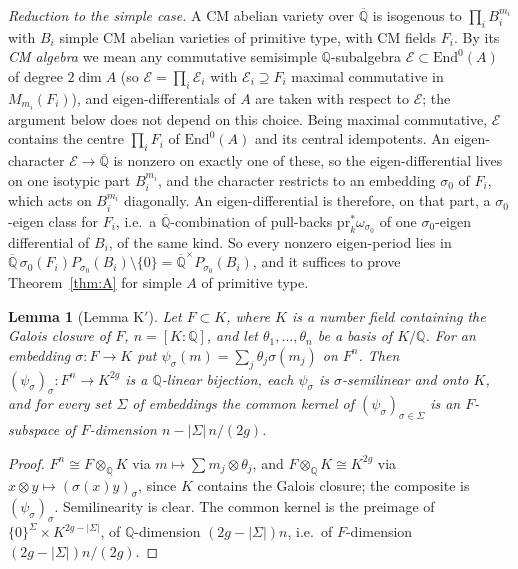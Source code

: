 \documentclass[11pt]{amsart}
\newtheorem{lemma}[theorem]{Lemma}
\theoremstyle{definition}
\newcommand{\Qb}{\overline{\mathbb{Q}}}
\newcommand{\Q}{\mathbb{Q}}
\begin{document}
\emph{Reduction to the simple case.} A CM abelian variety over $\Qb$ is isogenous to $\prod_iB_i^{m_i}$ with $B_i$ simple
CM abelian varieties of primitive type, with CM fields $F_i$. By its \emph{CM algebra} we mean any commutative semisimple
$\Q$-subalgebra $\mathcal E\subset\mathrm{End}^0(A)$ of degree $2\dim A$ (so $\mathcal E=\prod_i\mathcal E_i$ with
$\mathcal E_i\supseteq F_i$ maximal commutative in $M_{m_i}(F_i)$), and eigen-differentials of $A$ are taken with respect to
$\mathcal E$; the argument below does not depend on this choice. Being maximal commutative, $\mathcal E$ contains the
centre $\prod_iF_i$ of $\mathrm{End}^0(A)$ and its central idempotents. An eigen-character $\mathcal E\to\Qb$ is nonzero
on exactly one of these, so the eigen-differential lives on one isotypic part $B_i^{m_i}$, and the character restricts to
an embedding $\sigma_0$ of $F_i$, which acts on $B_i^{m_i}$ diagonally. An eigen-differential is therefore, on that part,
a $\sigma_0$-eigen class for $F_i$, i.e.\ a $\Qb$-combination of pull-backs $\mathrm{pr}_k^*\omega_{\sigma_0}$ of one
$\sigma_0$-eigen differential of $B_i$, of the same kind. So every nonzero eigen-period lies in
$\Qb\,\sigma_0(F_i)P_{\sigma_0}(B_i)\setminus\{0\}=\Qb^\times P_{\sigma_0}(B_i)$, and it suffices to prove
Theorem~\ref{thm:A} for simple $A$ of primitive type.

\begin{lemma}[Lemma K$'$]\label{lem:Kprime}
Let $F\subset K$, where $K$ is a number field containing the Galois closure of $F$, $n=[K:\Q]$, and let
$\theta_1,\dots,\theta_n$ be a basis of $K/\Q$. For an embedding $\sigma\colon F\to K$ put
$\psi_\sigma(m)=\sum_j\theta_j\sigma(m_j)$ on $F^n$. Then $(\psi_\sigma)_\sigma\colon F^n\to K^{2g}$ is a $\Q$-linear
bijection, each $\psi_\sigma$ is $\sigma$-semilinear and onto $K$, and for every set $\Sigma$ of embeddings the common
kernel of $(\psi_\sigma)_{\sigma\in\Sigma}$ is an $F$-subspace of $F$-dimension $n-|\Sigma|\,n/(2g)$.
\end{lemma}

\begin{proof}
$F^n\cong F\otimes_\Q K$ via $m\mapsto\sum m_j\otimes\theta_j$, and $F\otimes_\Q K\cong K^{2g}$ via
$x\otimes y\mapsto(\sigma(x)y)_\sigma$, since $K$ contains the Galois closure; the composite is $(\psi_\sigma)_\sigma$.
Semilinearity is clear. The common kernel is the preimage of $\{0\}^{\Sigma}\times K^{2g-|\Sigma|}$, of $\Q$-dimension
$(2g-|\Sigma|)n$, i.e.\ of $F$-dimension $(2g-|\Sigma|)n/(2g)$.
\end{proof}
\end{document}
